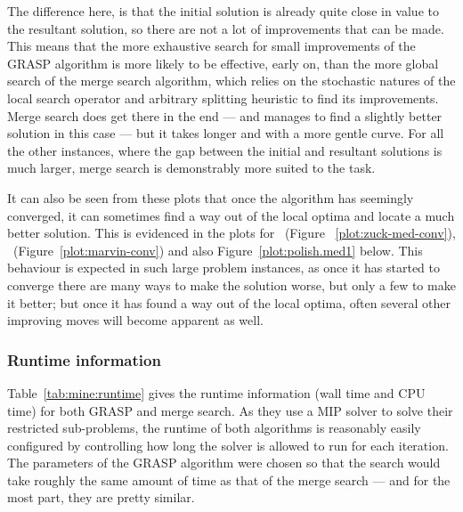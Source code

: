 \documentclass[preprint]{elsarticle}
\begin{document}
The difference here, is that the initial solution is already quite close in value to the resultant solution, so there are not a lot of improvements that can be made. This means that the more exhaustive search for small improvements of the GRASP algorithm is more likely to be effective, early on, than the more global search of the merge search algorithm, which relies on the stochastic natures of the local search operator and arbitrary splitting heuristic to find its improvements. Merge search does get there in the end --- and manages to find a slightly better solution in this case --- but it takes longer and with a more gentle curve. For all the other instances, where the gap between the initial and resultant solutions is much larger, merge search is demonstrably more suited to the task.

It can also be seen from these plots that once the algorithm has seemingly converged, it can sometimes find a way out of the local optima and locate a much better solution. This is evidenced in the plots for \zuckmed{}~(Figure ~\ref{plot:zuck-med-conv}), \marvin{}~(Figure~\ref{plot:marvin-conv}) and also Figure~\ref{plot:polish.med1} below. This behaviour is expected in such large problem instances, as once it has started to converge there are many ways to make the solution worse, but only a few to make it better; but once it has found a way out of the local optima, often several other improving moves will become apparent as well.

\subsubsection*{\textbf{Runtime information}}

Table~\ref{tab:mine:runtime} gives the runtime information (wall time and CPU time) for both GRASP and merge search. As they use a MIP solver to solve their restricted sub-problems, the runtime of both algorithms is reasonably easily configured by controlling how long the solver is allowed to run for each iteration. The parameters of the GRASP algorithm were chosen so that the search would take roughly the same amount of time as that of the merge search --- and for the most part, they are pretty similar. 
\end{document}
